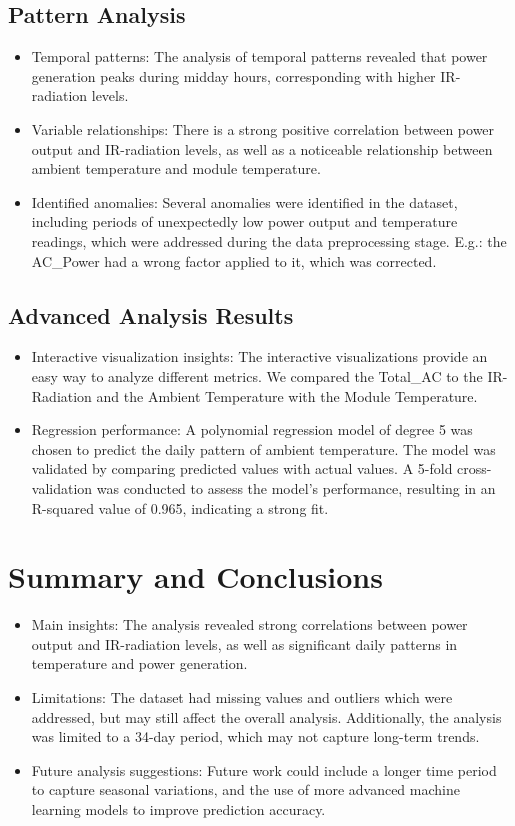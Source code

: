 \documentclass[10pt]{article}
\begin{document}
\subsection{Pattern Analysis}
\begin{itemize}
    \item Temporal patterns: The analysis of temporal patterns revealed that power generation peaks during midday hours, corresponding with higher IR-radiation levels.
    \item Variable relationships: There is a strong positive correlation between power output and IR-radiation levels, as well as a noticeable relationship between ambient temperature and module temperature.
    \item Identified anomalies: Several anomalies were identified in the dataset, including periods of unexpectedly low power output and temperature readings, which were addressed during the data preprocessing stage. E.g.: the AC\_Power had a wrong factor applied to it, which was corrected.
\end{itemize}

\subsection{Advanced Analysis Results}
\begin{itemize}
    \item Interactive visualization insights: The interactive visualizations provide an easy way to analyze different metrics. We compared the Total\_AC to the IR-Radiation and the Ambient Temperature with the Module Temperature.
    \item Regression performance: A polynomial regression model of degree 5 was chosen to predict the daily pattern of ambient temperature. The model was validated by comparing predicted values with actual values. A 5-fold cross-validation was conducted to assess the model's performance, resulting in an R-squared value of 0.965, indicating a strong fit.
\end{itemize}

\section{Summary and Conclusions}
\begin{itemize}
    \item Main insights: The analysis revealed strong correlations between power output and IR-radiation levels, as well as significant daily patterns in temperature and power generation.
    \item Limitations: The dataset had missing values and outliers which were addressed, but may still affect the overall analysis. Additionally, the analysis was limited to a 34-day period, which may not capture long-term trends.
    \item Future analysis suggestions: Future work could include a longer time period to capture seasonal variations, and the use of more advanced machine learning models to improve prediction accuracy.
\end{itemize}

\end{document}
